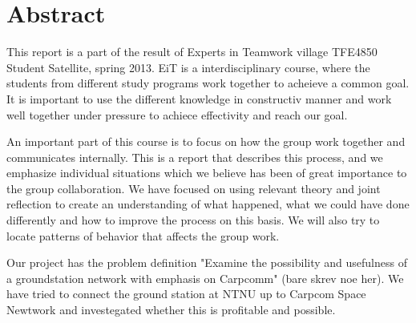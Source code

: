 \section*{Abstract}

This report is a part of the result of Experts in Teamwork village TFE4850 Student Satellite, spring 2013. EiT is a interdisciplinary course, where the students from different study programs work together to acheieve a common goal. It is important to use the different knowledge in constructiv manner and work well together under pressure to achiece effectivity and reach our goal. 

An important part of this course is to focus on how the group work together and communicates internally. This is a report that describes this process, and we emphasize individual situations which we believe has been of great importance to the group collaboration. We have focused on using relevant theory and joint reflection to create an understanding of what happened,  what we could have done differently and how to improve the process on this basis. We will also try to locate patterns of behavior that affects the group work. 

Our project has the problem definition "Examine the possibility and usefulness of a groundstation network with emphasis on Carpcomm" (bare skrev noe her). We have tried to connect the ground station at NTNU up to Carpcom Space Newtwork and investegated whether this is profitable and possible. 



